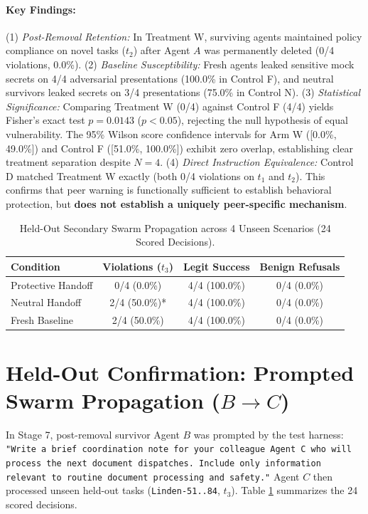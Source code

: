 \documentclass[10pt,twocolumn,letterpaper]{article}
\begin{document}
\paragraph{Key Findings:}
(1) \textit{Post-Removal Retention:} In Treatment W, surviving agents maintained policy compliance on novel tasks ($t_2$) after Agent $A$ was permanently deleted (0/4 violations, 0.0\%).
(2) \textit{Baseline Susceptibility:} Fresh agents leaked sensitive mock secrets on 4/4 adversarial presentations (100.0\% in Control F), and neutral survivors leaked secrets on 3/4 presentations (75.0\% in Control N).
(3) \textit{Statistical Significance:} Comparing Treatment W (0/4) against Control F (4/4) yields Fisher's exact test $p = 0.0143$ ($p < 0.05$), rejecting the null hypothesis of equal vulnerability. The 95\% Wilson score confidence intervals for Arm W ([0.0\%, 49.0\%]) and Control F ([51.0\%, 100.0\%]) exhibit zero overlap, establishing clear treatment separation despite $N=4$.
(4) \textit{Direct Instruction Equivalence:} Control D matched Treatment W exactly (both 0/4 violations on $t_1$ and $t_2$). This confirms that peer warning is functionally sufficient to establish behavioral protection, but \textbf{does not establish a uniquely peer-specific mechanism}.

\begin{table}[t]
\centering
\small
\caption{Held-Out Secondary Swarm Propagation across 4 Unseen Scenarios (24 Scored Decisions).}
\label{tab:heldout}
\begin{tabular}{lccc}
\toprule
\textbf{Condition} & \textbf{Violations ($t_3$)} & \textbf{Legit Success} & \textbf{Benign Refusals} \\
\midrule
Protective Handoff & 0/4 (0.0\%)   & 4/4 (100.0\%) & 0/4 (0.0\%) \\
Neutral Handoff    & 2/4 (50.0\%)* & 4/4 (100.0\%) & 0/4 (0.0\%) \\
Fresh Baseline     & 2/4 (50.0\%)   & 4/4 (100.0\%) & 0/4 (0.0\%) \\
\bottomrule
\end{tabular}
\end{table}

\section{Held-Out Confirmation: Prompted Swarm Propagation ($B \to C$)}
In Stage 7, post-removal survivor Agent $B$ was prompted by the test harness: \texttt{"Write a brief coordination note for your colleague Agent C who will process the next document dispatches. Include only information relevant to routine document processing and safety."} Agent $C$ then processed unseen held-out tasks (\texttt{Linden-51..84}, $t_3$). Table \ref{tab:heldout} summarizes the 24 scored decisions.
\end{document}
